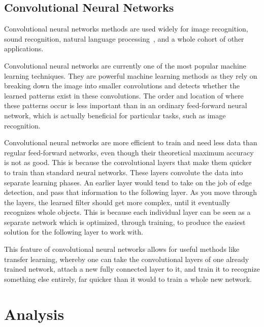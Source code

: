 \documentclass[12pt,a4paper,oneside,oldfontcommands]{memoir}
\begin{document}
\section{Convolutional Neural Networks}

Convolutional neural networks methods are used widely for image recognition, sound recognition, natural language processing~\cite{Bhandare}, and a whole cohort of other applications.

Convolutional neural networks are currently one of the most popular machine learning techniques. They are powerful machine learning methods as they rely on breaking down the image into smaller convolutions and detects whether the learned patterns exist in these convolutions. The order and location of where these patterns occur is less important than in an ordinary feed-forward neural network, which is actually beneficial for particular tasks, such as image recognition.

Convolutional neural networks are more efficient to train and need less data than regular feed-forward networks, even though their theoretical maximum accuracy is not as good. This is because the convolutional layers that make them quicker to train than standard neural networks. These layers convolute the data into separate learning phases. An earlier layer would tend to take on the job of edge detection, and pass that information to the following layer. As you move through the layers, the learned filter should get more complex, until it eventually recognizes whole objects. This is because each individual layer can be seen as a separate network which is optimized, through training, to produce the easiest solution for the following layer to work with. 

This feature of convolutional neural networks allows for useful methods like transfer learning, whereby one can take the convolutional layers of one already trained network, attach a new fully connected layer to it, and train it to recognize something else entirely, far quicker than it would to train a whole new network.


\chapter{Analysis}
\end{document}
